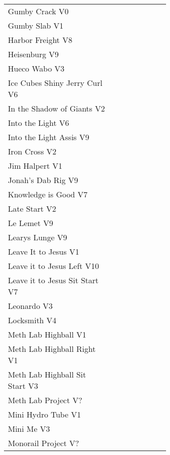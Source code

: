 \begin{flushleft}
\begin{center}
\begin{supertabular}{p{0.65\linewidth}r}
Gumby Crack V0 & \pageref{rt:Gumby Crack} \\
Gumby Slab V1 & \pageref{rt:Gumby Slab} \\
Harbor Freight V8 & \pageref{vr:Harbor Freight} \\
Heisenburg V9 & \pageref{rt:Heisenburg} \\
Hueco Wabo V3 & \pageref{rt:Hueco Wabo} \\
Ice Cubes Shiny Jerry Curl V6 & \pageref{rt:Ice Cubes Shiny Jerry Curl} \\
In the Shadow of Giants V2 & \pageref{rt:In the Shadow of Giants} \\
Into the Light V6 & \pageref{rt:Into the Light} \\
Into the Light Assis V9 & \pageref{vr:Into the Light Assis} \\
Iron Cross V2 & \pageref{vr:Iron Cross} \\
Jim Halpert V1 & \pageref{rt:Jim Halpert} \\
Jonah's Dab Rig V9 & \pageref{rt:Jonah's Dab Rig} \\
Knowledge is Good V7 & \pageref{rt:Knowledge is Good} \\
Late Start V2 & \pageref{vr:Late Start} \\
Le Lemet V9 & \pageref{rt:Le Lemet} \\
Learys Lunge V9 & \pageref{vr:Learys Lunge} \\
Leave It to Jesus V1 & \pageref{rt:Leave It to Jesus} \\
Leave it to Jesus Left V10 & \pageref{vr:Leave it to Jesus Left} \\
Leave it to Jesus Sit Start V7 & \pageref{vr:Leave it to Jesus Sit Start} \\
Leonardo V3 & \pageref{rt:Leonardo} \\
Locksmith V4 & \pageref{rt:Locksmith} \\
Meth Lab Highball V1 & \pageref{rt:Meth Lab Highball} \\
Meth Lab Highball Right V1 & \pageref{rt:Meth Lab Highball Right} \\
Meth Lab Highball Sit Start V3 & \pageref{vr:Meth Lab Highball Sit Start} \\
Meth Lab Project V? & \pageref{rt:Meth Lab Project} \\
Mini Hydro Tube V1 & \pageref{rt:Mini Hydro Tube} \\
Mini Me V3 & \pageref{rt:Mini Me} \\
Monorail Project V? & \pageref{rt:Monorail Project} \\

\end{supertabular}
\end{center}
\end{flushleft}
